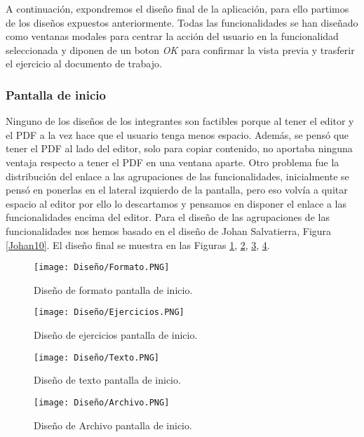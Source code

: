 A continuación, expondremos el diseño final de la aplicación, para ello partimos de los diseños expuestos anteriormente. Todas las funcionalidades se han diseñado como ventanas modales para centrar la acción del usuario en la funcionalidad seleccionada y diponen de un boton \textit{OK} para confirmar la vista previa y trasferir el ejercicio al documento de trabajo. 


\subsubsection{Pantalla de inicio}
Ninguno de los diseños de los integrantes son factibles porque al tener el editor y el PDF a la vez hace que el usuario tenga menos espacio. Además, se pensó que tener el PDF al lado del editor, solo para copiar contenido, no aportaba ninguna ventaja respecto a tener el PDF en una ventana aparte. Otro problema fue la distribución del enlace a las agrupaciones de las funcionalidades, inicialmente se pensó en ponerlas en el lateral izquierdo de la pantalla, pero eso volvía a quitar espacio al editor por ello lo descartamos y pensamos en disponer el enlace a las funcionalidades encima del editor. Para el diseño de las agrupaciones de las funcionalidades nos hemos basado en el diseño de Johan Salvatierra, Figura \ref{Johan10}. El diseño final se  muestra en las Figuras \ref{Forato}, \ref{ejercicios}, \ref{texto}, \ref{archivo}.

\begin{figure}[ht!]
  \centering
  \texttt{[image: Diseño/Formato.PNG]}
  \caption{Diseño de formato pantalla de inicio.}
  \label{Forato}
\end{figure}


\begin{figure}[ht!]
  \centering
  \texttt{[image: Diseño/Ejercicios.PNG]}
  \caption{Diseño de ejercicios pantalla de inicio.}
  \label{ejercicios}
\end{figure}


\begin{figure}[ht!]
  \centering
  \texttt{[image: Diseño/Texto.PNG]}
  \caption{Diseño de texto pantalla de inicio.}
  \label{texto}
\end{figure}


\begin{figure}[ht!]
  \centering
  \texttt{[image: Diseño/Archivo.PNG]}
  \caption{Diseño de Archivo pantalla de inicio.}
  \label{archivo}
\end{figure}


